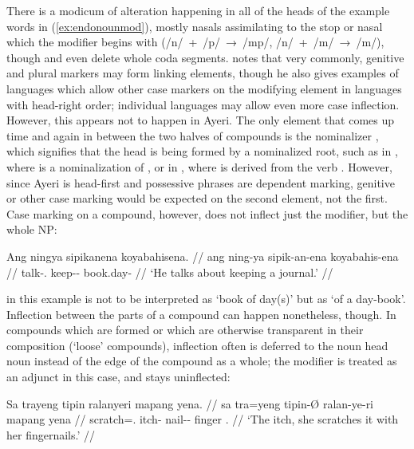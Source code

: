 There is a modicum of alteration happening in all of the heads of the example 
words in (\ref{ex:endonounmod}), mostly nasals assimilating to the stop or 
nasal which the modifier begins with (/n/~+~/p/~→~/mp/, /n/~+~/m/~→~/m/), 
though  and  even delete 
whole coda segments.
\citet[703]{bauer2001} notes that very commonly, genitive and plural markers 
may form linking elements, though he also gives examples of languages which
allow other case markers on the modifying element in languages with head-right
order; individual languages may allow even more case inflection. However, this
appears not to happen in Ayeri. The only element that comes up time and again
in between the two halves of compounds is the nominalizer ,
which signifies that the head is being formed by a nominalized root, such as in
, where  is a 
nominalization of , or in 
, where  is derived 
from the verb . However, since Ayeri is head-first and
possessive phrases are dependent marking, genitive or other case marking would
be expected on the second element, not the first. Case marking on a compound,
however, does not inflect just the modifier, but the whole NP:

\ex\begingl
	\gla Ang ningya sipikanena koyabahisena. //
	\glb ang ning-ya sipik-an-ena koyabahis-ena //
	\glc \AgtT{} talk-\TsgM{}.\Top{} keep-\Nmlz{}-\Gen{} book.day-\Gen{} //
	\glft `He talks about keeping a journal.' //
\endgl\xe

 in this example is not to be interpreted as 
`book of day(s)' but as `of a day-book'. Inflection between the parts of a
compound can happen nonetheless, though. In compounds which are formed  or which are otherwise transparent in their composition (`loose'
compounds\label{loosecomp}), inflection often is deferred to the noun head noun
instead of the edge of the compound as a whole; the modifier is treated as an
adjunct in this case, and stays uninflected:

\ex\label{ex:nouncompdiv}\begingl
	\gla Sa trayeng tipin ralanyeri mapang yena. //
	\glb sa tra=yeng tipin-Ø ralan-ye-ri mapang yena //
	\glc \PatT{} scratch=\TsgF{}.\Aarg{} itch-\Top{} nail-\Pl{}-\Ins{} 
		finger \TsgF{}.\Gen{} //
	\glft `The itch, she scratches it with her fingernails.' //
\endgl\xe

